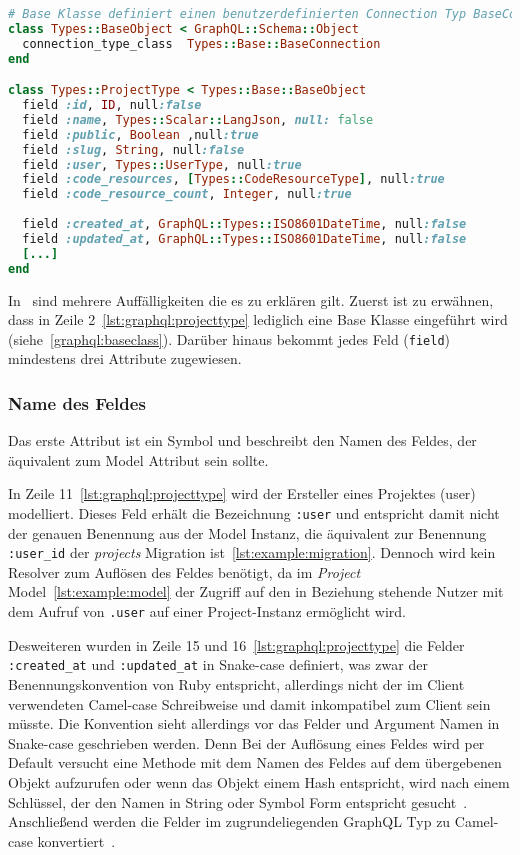 \begin{lstlisting}[language=Ruby,float=h!,caption={Definition des ProjectTypes zum Abbilden von Project Model Instanzen}, label={lst:graphql:projecttype}]
# Base Klasse definiert einen benutzerdefinierten Connection Typ BaseConnection 
class Types::BaseObject < GraphQL::Schema::Object
  connection_type_class  Types::Base::BaseConnection
end

class Types::ProjectType < Types::Base::BaseObject
  field :id, ID, null:false
  field :name, Types::Scalar::LangJson, null: false
  field :public, Boolean ,null:true
  field :slug, String, null:false
  field :user, Types::UserType, null:true
  field :code_resources, [Types::CodeResourceType], null:true
  field :code_resource_count, Integer, null:true
  
  field :created_at, GraphQL::Types::ISO8601DateTime, null:false
  field :updated_at, GraphQL::Types::ISO8601DateTime, null:false
  [...]
end
\end{lstlisting}

In~ sind mehrere Auffälligkeiten die es zu erklären gilt.
Zuerst ist zu erwähnen, dass in Zeile 2~\ref{lst:graphql:projecttype} lediglich eine Base Klasse eingeführt wird (siehe~\ref{graphql:baseclass}).
Darüber hinaus bekommt jedes Feld (\lstinline|field|) mindestens drei Attribute zugewiesen. 

\subsubsection{Name des Feldes}
Das erste Attribut ist ein Symbol und beschreibt den Namen des Feldes, der äquivalent zum Model Attribut sein sollte. 

In Zeile 11~\ref{lst:graphql:projecttype} wird der Ersteller eines Projektes (user) modelliert. Dieses Feld erhält die Bezeichnung \lstinline|:user| und entspricht damit nicht der genauen Benennung aus der Model Instanz, die äquivalent zur Benennung \lstinline|:user_id| der \emph{projects} Migration ist~\ref{lst:example:migration}. Dennoch wird kein Resolver zum Auflösen des Feldes benötigt, da im \emph{Project} Model~\ref{lst:example:model} der Zugriff auf den in Beziehung stehende Nutzer mit dem Aufruf von \lstinline|.user| auf einer Project-Instanz ermöglicht wird. 

Desweiteren wurden in Zeile 15 und 16~\ref{lst:graphql:projecttype} die Felder \lstinline|:created_at| und \lstinline|:updated_at| in Snake-case definiert, was zwar der Benennungskonvention von Ruby entspricht, allerdings nicht der im Client verwendeten Camel-case Schreibweise und damit inkompatibel zum Client sein müsste. Die Konvention sieht allerdings vor das Felder und Argument Namen in Snake-case geschrieben werden. Denn Bei der Auflösung eines Feldes wird per Default versucht eine Methode mit dem Namen des Feldes auf dem übergebenen Objekt aufzurufen oder wenn das Objekt einem Hash entspricht, wird nach einem Schlüssel, der den Namen in String oder Symbol Form entspricht gesucht~\cite{graphql-field-resolution}. Anschließend werden die Felder im zugrundeliegenden GraphQL Typ zu Camel-case konvertiert~\cite{graphql-object-classes}.

